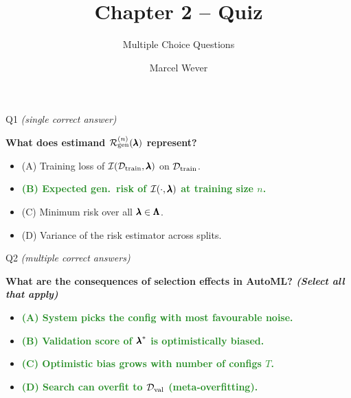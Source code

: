 \documentclass[main]{subfiles}
\title[AutoML: Introduction]{Chapter 2 -- Quiz}
\subtitle{Multiple Choice Questions}
\author[Marcel Wever]{Marcel Wever}
\date{}
\newcommand{\correct}[1]{\textcolor{ForestGreen}{\textbf{#1} \checkmark}}
\newcommand{\wrong}[1]{#1}
\begin{document}
    \maketitle

\begin{frame}{Q1 \hfill \small\normalfont\textit{(single correct answer)}}

\textbf{What does estimand $\mathcal{R}_{\text{gen}}^{(n)}(\pmb{\lambda})$ represent?}

\begin{itemize}
    \item \wrong{(A) \; Training loss of $\mathcal{I}(\mathcal{D}_{\text{train}}, \pmb{\lambda})$ on $\mathcal{D}_{\text{train}}$.}
    \item \correct{(B) \; Expected gen.\ risk of $\mathcal{I}(\cdot,\pmb{\lambda})$ at training size $n$.}
    \item \wrong{(C) \; Minimum risk over all $\pmb{\lambda} \in \pmb{\Lambda}$.}
    \item \wrong{(D) \; Variance of the risk estimator across splits.}
\end{itemize}

\end{frame}
%

\begin{frame}{Q2 \hfill \small\normalfont\textit{(multiple correct answers)}}

\textbf{What are the consequences of selection effects in AutoML? \textit{(Select all that apply)}}

\begin{itemize}
    \item \correct{(A) \; System picks the config with most favourable noise.}
    \item \correct{(B) \; Validation score of ${\pmb{\lambda}}^*$ is optimistically biased.}
    \item \correct{(C) \; Optimistic bias grows with number of configs $T$.}
    \item \correct{(D) \; Search can overfit to $\mathcal{D}_{\text{val}}$ (meta-overfitting).}
\end{itemize}

\end{frame}
\end{document}
